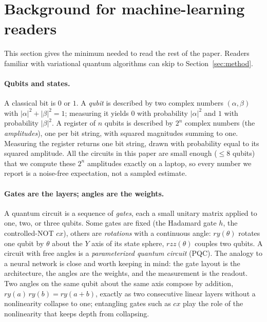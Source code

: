 \section{Background for machine-learning readers}
\label{sec:background}

This section gives the minimum needed to read the rest of the paper. Readers familiar with variational quantum algorithms can skip to Section~\ref{sec:method}.

\paragraph{Qubits and states.}
A classical bit is $0$ or $1$. A \emph{qubit} is described by two complex numbers $(\alpha, \beta)$ with $|\alpha|^2 + |\beta|^2 = 1$; measuring it yields $0$ with probability $|\alpha|^2$ and $1$ with probability $|\beta|^2$. A register of $n$ qubits is described by $2^n$ complex numbers (the \emph{amplitudes}), one per bit string, with squared magnitudes summing to one. Measuring the register returns one bit string, drawn with probability equal to its squared amplitude. All the circuits in this paper are small enough ($\leq 8$ qubits) that we compute these $2^n$ amplitudes exactly on a laptop, so every number we report is a noise-free expectation, not a sampled estimate.

\paragraph{Gates are the layers; angles are the weights.}
A quantum circuit is a sequence of \emph{gates}, each a small unitary matrix applied to one, two, or three qubits. Some gates are fixed (the Hadamard gate $h$, the controlled-NOT $cx$), others are \emph{rotations} with a continuous angle: $ry(\theta)$ rotates one qubit by $\theta$ about the $Y$ axis of its state sphere, $rzz(\theta)$ couples two qubits. A circuit with free angles is a \emph{parameterized quantum circuit} (PQC). The analogy to a neural network is close and worth keeping in mind: the gate layout is the architecture, the angles are the weights, and the measurement is the readout. Two angles on the same qubit about the same axis compose by addition, $ry(a)\,ry(b) = ry(a+b)$, exactly as two consecutive linear layers without a nonlinearity collapse to one; entangling gates such as $cx$ play the role of the nonlinearity that keeps depth from collapsing.

